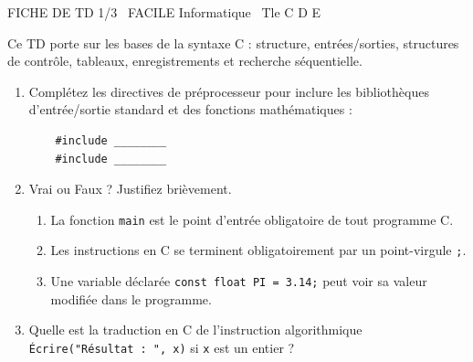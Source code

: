 \documentclass[11pt]{article}
\begin{document}
\begin{tcolorbox}[enhanced,colback=popink,colframe=popink,arc=10pt,boxrule=0pt,left=12pt,right=12pt,top=9pt,bottom=9pt]
{\color{white}\popxbold\small FICHE DE TD 1/3 \textbullet\ FACILE \hfill Informatique \textbullet\ Tle C D E\par}
\end{tcolorbox}
\vspace{4pt}
Ce TD porte sur les bases de la syntaxe C : structure, entrées/sorties, structures de contrôle, tableaux, enregistrements et recherche séquentielle.

\begin{exercice}
\begin{enumerate}
    \item Complétez les directives de préprocesseur pour inclure les bibliothèques d'entrée/sortie standard et des fonctions mathématiques :
    \begin{verbatim}
    #include ________
    #include ________
    \end{verbatim}
    \item Vrai ou Faux ? Justifiez brièvement.
    \begin{enumerate}
        \item La fonction \texttt{main} est le point d'entrée obligatoire de tout programme C.
        \item Les instructions en C se terminent obligatoirement par un point-virgule \texttt{;}.
        \item Une variable déclarée \texttt{const float PI = 3.14;} peut voir sa valeur modifiée dans le programme.
    \end{enumerate}
    \item Quelle est la traduction en C de l'instruction algorithmique \texttt{Écrire("Résultat : ", x)} si \texttt{x} est un entier ?
\end{enumerate}
\end{exercice}
\end{document}

